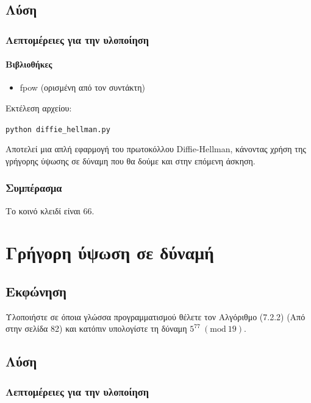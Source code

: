 \documentclass[oneside]{article}
\let\t\texttt
\newcommand{\Mod}[1]{\ (\mathrm{mod}\ #1)}
\begin{document}
\subsection{Λύση}

\subsubsection{Λεπτομέρειες για την υλοποίηση}

\paragraph{Βιβλιοθήκες}

\begin{itemize}
    \item fpow (ορισμένη από τον συντάκτη)
\end{itemize}

Εκτέλεση αρχείου:

\begin{center}
    \t{python diffie_hellman.py}
\end{center}

Αποτελεί μια απλή εφαρμογή του πρωτοκόλλου Diffie-Hellman, κάνοντας χρήση της γρήγορης ύψωσης σε δύναμη που θα δούμε και στην επόμενη άσκηση.

\subsubsection{Συμπέρασμα}

Το κοινό κλειδί είναι $66$.

\section{Γρήγορη ύψωση σε δύναμή}

\subsection{Εκφώνηση} 

Υλοποιήστε σε όποια γλώσσα προγραμματισμού θέλετε τον Αλγόριθμο (7.2.2) (Από \cite{draz:2022} στην σελίδα 82) και κατόπιν υπολογίστε τη δύναμη $5^{77} \Mod{19}$.

\subsection{Λύση} 

\subsubsection{Λεπτομέρειες για την υλοποίηση}
\end{document}
